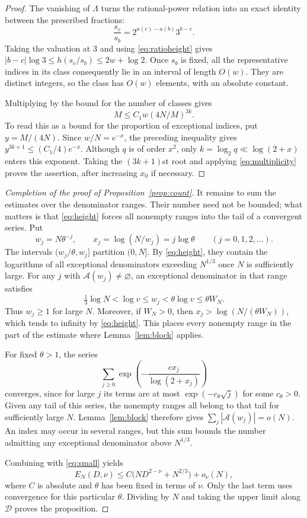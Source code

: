 \documentclass[11pt,reqno]{amsart}
\theoremstyle{definition}
\newcommand{\DD}{\mathcal D}
\begin{document}
\begin{proof}
The vanishing of $\Lambda$ turns the rational-power
relation into an exact identity between the prescribed
fractions:
\[
 \frac{s_c}{s_b}=2^{a(c)-a(b)}3^{b-c}.
\]
Taking the valuation at $3$ and using \eqref{eq:ratioheight} gives
$|b-c|\log3\le h(s_c/s_b)\le2w+\log2$. Once $s_b$ is fixed, all
the representative indices in its class consequently lie in an
interval of length $O(w)$. They are distinct integers, so the class
has $O(w)$ elements, with an absolute constant.

Multiplying by the bound for the number of classes gives
\[
 M\le C_1 w(4N/M)^{3k}.
\]
To read this as a bound for the proportion of exceptional indices,
put $y=M/(4N)$. Since $w/N=e^{-x}$, the preceding inequality gives
$y^{3k+1}\le(C_1/4)e^{-x}$. Although $q$ is of order $x^2$,
only $k=\log_2 q\ll\log(2+x)$ enters this exponent. Taking the
$(3k+1)$st root and applying \eqref{eq:multiplicity} proves the
assertion, after increasing $x_0$ if necessary.
\end{proof}

\begin{proof}[Completion of the proof of Proposition~\ref{prop:count}]
It remains to sum the estimates over the denominator
ranges. Their number need not be bounded; what matters
is that \eqref{eq:height} forces all nonempty ranges
into the tail of a convergent series. Put
\[
 w_j=N\theta^{-j},\qquad x_j=\log(N/w_j)=j\log\theta
 \qquad(j=0,1,2,\ldots).
\]
The intervals $(w_j/\theta,w_j]$ partition $(0,N]$. By
\eqref{eq:height}, they contain the logarithms of all exceptional
denominators exceeding $N^{1/3}$ once $N$ is sufficiently large.
For any $j$ with $\mathcal A(w_j)\ne\varnothing$, an exceptional
denominator in that range satisfies
\[
 \tfrac13\log N<\log v\le w_j<\theta\log v\le\theta W_N .
\]
Thus $w_j\ge1$ for large $N$. Moreover, if $W_N>0$, then
$x_j>\log(N/(\theta W_N))$, which tends to infinity by
\eqref{eq:height}. This places every nonempty range in the part of
the estimate where Lemma~\ref{lem:block} applies.

For fixed $\theta>1$, the series
\[
 \sum_{j\ge0}\exp\!\left(-\frac{c x_j}{\log(2+x_j)}\right)
\]
converges, since for large $j$ its terms are at most
$\exp(-c_\theta\sqrt j)$ for some $c_\theta>0$. Given any tail
of this series, the nonempty ranges all belong to that tail for
sufficiently large $N$. Lemma~\ref{lem:block} therefore gives
$\sum_j|\mathcal A(w_j)|=o(N)$. An index may occur in several
ranges, but this sum bounds the number admitting any exceptional
denominator above $N^{1/3}$.

Combining with \eqref{eq:small} yields
\[
 E_N(D,\nu)\le C\bigl(ND^{2-\nu}+N^{2/3}\bigr)+o_\nu(N),
\]
where $C$ is absolute and $\theta$ has been fixed in terms of $\nu$.
Only the last term uses convergence for this particular $\theta$.
Dividing by $N$ and taking the upper limit along $\DD$ proves the
proposition.
\end{proof}
\end{document}
